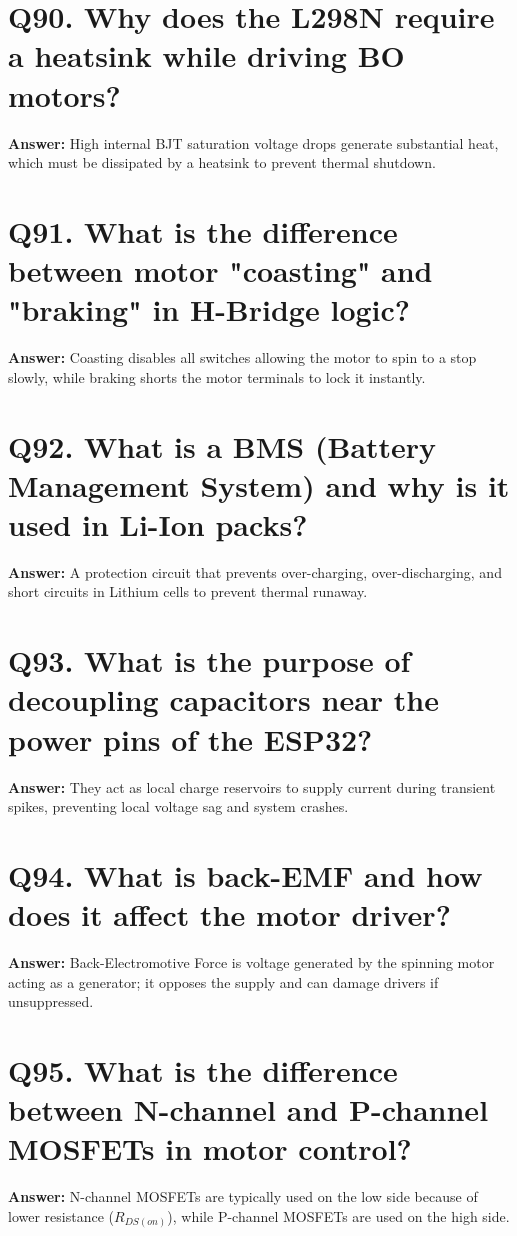 \documentclass[12pt,a4paper,oneside]{report}
\begin{document}
\section{Q90. Why does the L298N require a heatsink while driving BO motors?}
\textbf{Answer:} High internal BJT saturation voltage drops generate substantial heat, which must be dissipated by a heatsink to prevent thermal shutdown.

\section{Q91. What is the difference between motor "coasting" and "braking" in H-Bridge logic?}
\textbf{Answer:} Coasting disables all switches allowing the motor to spin to a stop slowly, while braking shorts the motor terminals to lock it instantly.

\section{Q92. What is a BMS (Battery Management System) and why is it used in Li-Ion packs?}
\textbf{Answer:} A protection circuit that prevents over-charging, over-discharging, and short circuits in Lithium cells to prevent thermal runaway.

\section{Q93. What is the purpose of decoupling capacitors near the power pins of the ESP32?}
\textbf{Answer:} They act as local charge reservoirs to supply current during transient spikes, preventing local voltage sag and system crashes.

\section{Q94. What is back-EMF and how does it affect the motor driver?}
\textbf{Answer:} Back-Electromotive Force is voltage generated by the spinning motor acting as a generator; it opposes the supply and can damage drivers if unsuppressed.

\section{Q95. What is the difference between N-channel and P-channel MOSFETs in motor control?}
\textbf{Answer:} N-channel MOSFETs are typically used on the low side because of lower resistance ($R_{DS(on)}$), while P-channel MOSFETs are used on the high side.
\end{document}
